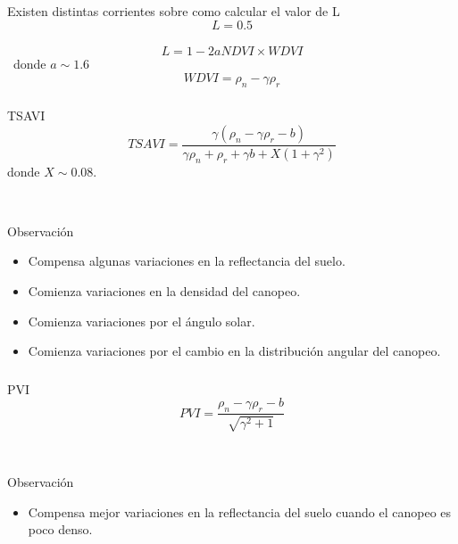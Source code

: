 \documentclass[]{beamer}
\begin{document}
\begin{frame}
    \frametitle{\subsecname}
    Existen distintas corrientes sobre como calcular el valor de L
    \begin{equation}
        L=0.5
    \end{equation}\pause\
    \begin{equation}
        L = 1-2 a NDVI \times WDVI
    \end{equation}\pause\
    donde $a\sim 1.6$
    \begin{equation}
        WDVI = \rho_n -\gamma \rho_r
    \end{equation}
\end{frame}

\begin{frame}
    \frametitle{\subsecname}
    \begin{block}{TSAVI}
        \begin{equation}
            TSAVI =
            \frac{\gamma(\rho_n-\gamma\rho_r-b)}{\gamma\rho_n+\rho_r+\gamma b
            +X(1+\gamma^2)} 
        \end{equation}
        donde $X\sim0.08$.
    \end{block}\pause\
    \begin{block}{Observación}
        \begin{itemize}[<+->]
            \item Compensa algunas variaciones en la reflectancia del suelo.
            \item Comienza variaciones en la densidad del canopeo.
            \item Comienza variaciones por el ángulo solar.
            \item Comienza variaciones por el cambio en la distribución
                angular del canopeo.
        \end{itemize}
    \end{block}
\end{frame}

\begin{frame}
    \frametitle{\subsecname}
    \begin{block}{PVI}
        \begin{equation}
            PVI = \frac{\rho_n-\gamma\rho_r-b}{\sqrt{\gamma^2+1}}
        \end{equation}
    \end{block}\pause\
    \begin{block}{Observación}
        \begin{itemize}
            \item Compensa mejor variaciones en la reflectancia del suelo cuando
                el canopeo es poco denso.
        \end{itemize}
    \end{block}
\end{frame}
\end{document}
